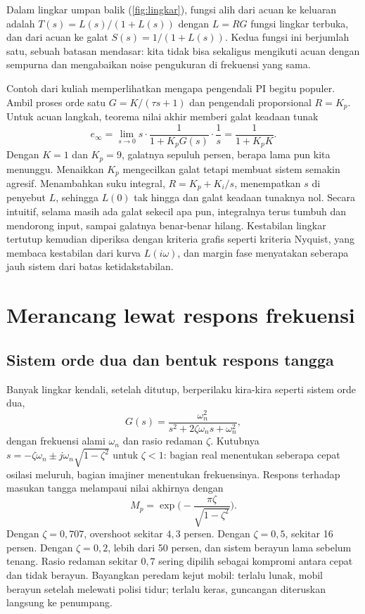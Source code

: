 Dalam lingkar umpan balik (\cref{fig:lingkar}), fungsi alih dari acuan ke keluaran adalah
$T(s)=L(s)/(1+L(s))$ dengan $L=RG$ fungsi lingkar terbuka, dan dari acuan ke galat $S(s)=1/(1+L(s))$. Kedua
fungsi ini berjumlah satu, sebuah batasan mendasar: kita tidak bisa sekaligus mengikuti acuan dengan sempurna
dan mengabaikan noise pengukuran di frekuensi yang sama.

Contoh dari kuliah memperlihatkan mengapa pengendali PI begitu populer. Ambil proses orde satu
$G=K/(\tau s+1)$ dan pengendali proporsional $R=K_p$. Untuk acuan langkah, teorema nilai akhir memberi galat
keadaan tunak
\begin{equation}
e_\infty=\lim_{s\to0}s\cdot\frac1{1+K_pG(s)}\cdot\frac1s=\frac1{1+K_pK}.
\end{equation}
Dengan $K=1$ dan $K_p=9$, galatnya sepuluh persen, berapa lama pun kita menunggu. Menaikkan $K_p$ mengecilkan
galat tetapi membuat sistem semakin agresif. Menambahkan suku integral, $R=K_p+K_i/s$, menempatkan $s$ di penyebut
$L$, sehingga $L(0)$ tak hingga dan galat keadaan tunaknya nol. Secara intuitif, selama masih ada galat sekecil
apa pun, integralnya terus tumbuh dan mendorong input, sampai galatnya benar-benar hilang. Kestabilan lingkar
tertutup kemudian diperiksa dengan kriteria grafis seperti kriteria Nyquist, yang membaca kestabilan dari kurva
$L(i\omega)$, dan margin fase menyatakan seberapa jauh sistem dari batas ketidakstabilan.

\section{Merancang lewat respons frekuensi}

\subsection{Sistem orde dua dan bentuk respons tangga}

Banyak lingkar kendali, setelah ditutup, berperilaku kira-kira seperti sistem orde dua,
\begin{equation}
G(s)=\frac{\omega_n^2}{s^2+2\zeta\omega_ns+\omega_n^2},
\end{equation}
dengan frekuensi alami $\omega_n$ dan rasio redaman $\zeta$. Kutubnya $s=-\zeta\omega_n\pm j\omega_n\sqrt{1-\zeta^2}$ untuk $\zeta<1$:
bagian real menentukan seberapa cepat osilasi meluruh, bagian imajiner menentukan frekuensinya. Respons terhadap masukan
tangga melampaui nilai akhirnya dengan 
\begin{equation}
M_p=\exp\Big(-\frac{\pi\zeta}{\sqrt{1-\zeta^2}}\Big).
\end{equation}
Dengan $\zeta=0{,}707$, overshoot sekitar $4{,}3$ persen. Dengan $\zeta=0{,}5$, sekitar 16 persen. Dengan $\zeta=0{,}2$, lebih dari 50
persen, dan sistem berayun lama sebelum tenang. Rasio redaman sekitar $0{,}7$ sering dipilih sebagai kompromi antara cepat dan
tidak berayun. Bayangkan peredam kejut mobil: terlalu lunak, mobil berayun setelah melewati polisi tidur; terlalu keras, guncangan
diteruskan langsung ke penumpang.


